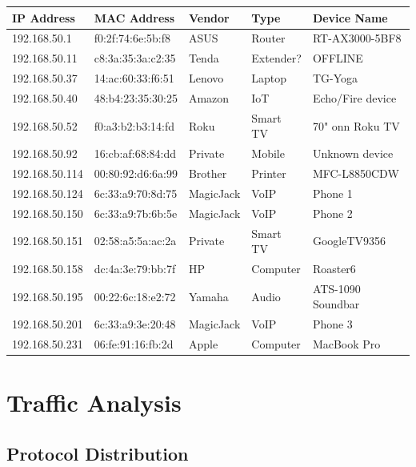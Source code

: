 \documentclass[11pt,letterpaper]{article}
\begin{document}
\begin{longtable}{@{}llllp{3.5cm}@{}}
\toprule
\textbf{IP Address} & \textbf{MAC Address} & \textbf{Vendor} & \textbf{Type} & \textbf{Device Name} \\
\midrule
\endhead

192.168.50.1 & f0:2f:74:6e:5b:f8 & ASUS & Router & RT-AX3000-5BF8 \\
192.168.50.11 & c8:3a:35:3a:c2:35 & Tenda & Extender? & \textcolor{warningcolor}{OFFLINE} \\
192.168.50.37 & 14:ac:60:33:f6:51 & Lenovo & Laptop & TG-Yoga \\
192.168.50.40 & 48:b4:23:35:30:25 & Amazon & IoT & Echo/Fire device \\
192.168.50.52 & f0:a3:b2:b3:14:fd & Roku & Smart TV & 70" onn Roku TV \\
192.168.50.92 & 16:cb:af:68:84:dd & Private & Mobile & Unknown device \\
192.168.50.114 & 00:80:92:d6:6a:99 & Brother & Printer & MFC-L8850CDW \\
192.168.50.124 & 6c:33:a9:70:8d:75 & MagicJack & VoIP & Phone 1 \\
192.168.50.150 & 6c:33:a9:7b:6b:5e & MagicJack & VoIP & Phone 2 \\
192.168.50.151 & 02:58:a5:5a:ac:2a & Private & Smart TV & GoogleTV9356 \\
192.168.50.158 & dc:4a:3e:79:bb:7f & HP & Computer & Roaster6 \\
192.168.50.195 & 00:22:6c:18:e2:72 & Yamaha & Audio & ATS-1090 Soundbar \\
192.168.50.201 & 6c:33:a9:3e:20:48 & MagicJack & VoIP & Phone 3 \\
192.168.50.231 & 06:fe:91:16:fb:2d & Apple & Computer & MacBook Pro \\

\bottomrule
\end{longtable}

\section{Traffic Analysis}

\subsection{Protocol Distribution}
\end{document}
